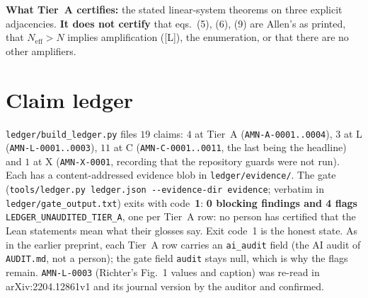 \documentclass[10pt]{article}
\newcommand{\tier}[1]{\textsf{[#1]}}
\newcommand{\tL}{\tier{L}}
\newcommand{\Neff}{N_{\mathrm{eff}}}
\begin{document}
\textbf{What Tier~A certifies:} the stated linear-system theorems on three explicit adjacencies. \textbf{It does not certify} that eqs.~(5), (6), (9) are Allen's as printed, that $\Neff>N$ implies amplification (\tL), the enumeration, or that there are no other amplifiers.

\section{Claim ledger}\label{sec:ledger}
\texttt{ledger/build\_ledger.py} files $19$ claims: $4$ at Tier~A (\texttt{AMN-A-0001..0004}), $3$ at L (\texttt{AMN-L-0001..0003}), $11$ at C (\texttt{AMN-C-0001..0011}, the last being the headline) and $1$ at X (\texttt{AMN-X-0001}, recording that the repository guards were not run). Each has a content-addressed evidence blob in \texttt{ledger/evidence/}. The gate (\texttt{tools/ledger.py ledger.json -{}-evidence-dir evidence}; verbatim in \texttt{ledger/gate\_output.txt}) exits with code~\textbf{1}: \textbf{0 blocking findings and 4 flags} \texttt{LEDGER\_UNAUDITED\_TIER\_A}, one per Tier~A row: no person has certified that the Lean statements mean what their glosses say. Exit code~1 is the honest state. As in the earlier preprint, each Tier~A row carries an \texttt{ai\_audit} field (the AI audit of \texttt{AUDIT.md}, not a person); the gate field \texttt{audit} stays null, which is why the flags remain. \texttt{AMN-L-0003} (Richter's Fig.~1 values and caption) was re-read in arXiv:2204.12861v1 and its journal version by the auditor and confirmed.

\end{document}
